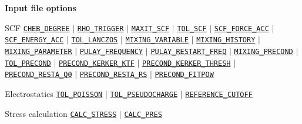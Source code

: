 \documentclass[xcolor=dvipsnames,t]{beamer}
\begin{document}
\begin{frame}[allowframebreaks]{\textbf{Input file options}}
\begin{block}{SCF}
\hyperlink{CHEB_DEGREE}{\texttt{CHEB\_DEGREE}} $\vert$ \hyperlink{RHO_TRIGGER}{\texttt{RHO\_TRIGGER}} $\vert$ \hyperlink{MAXIT_SCF}{\texttt{MAXIT\_SCF}} $\vert$ \hyperlink{TOL_SCF}{\texttt{TOL\_SCF}} $\vert$ \hyperlink{SCF_FORCE_ACC}{\texttt{SCF\_FORCE\_ACC}} $\vert$ \hyperlink{SCF_ENERGY_ACC}{\texttt{SCF\_ENERGY\_ACC}} $\vert$ \hyperlink{TOL_LANCZOS}{\texttt{TOL\_LANCZOS}} $\vert$ \hyperlink{MIXING_VARIABLE}{\texttt{MIXING\_VARIABLE}} $\vert$ \hyperlink{MIXING_HISTORY}{\texttt{MIXING\_HISTORY}} $\vert$ \hyperlink{MIXING_PARAMETER}{\texttt{MIXING\_PARAMETER}} $\vert$ \hyperlink{PULAY_FREQUENCY}{\texttt{PULAY\_FREQUENCY}} $\vert$ \hyperlink{PULAY_RESTART_FREQ}{\texttt{PULAY\_RESTART\_FREQ}} $\vert$ \hyperlink{MIXING_PRECOND}{\texttt{MIXING\_PRECOND}} $\vert$ \hyperlink{TOL_PRECOND}{\texttt{TOL\_PRECOND}} $\vert$ \hyperlink{PRECOND_KERKER_KTF}{\texttt{PRECOND\_KERKER\_KTF}} $\vert$ \hyperlink{PRECOND_KERKER_THRESH}{\texttt{PRECOND\_KERKER\_THRESH}} $\vert$ \hyperlink{PRECOND_RESTA_Q0}{\texttt{PRECOND\_RESTA\_Q0}} $\vert$ \hyperlink{PRECOND_RESTA_RS}{\texttt{PRECOND\_RESTA\_RS}} $\vert$ \hyperlink{PRECOND_FITPOW}{\texttt{PRECOND\_FITPOW}}
\end{block}

\vspace{-2mm}
\begin{block}{Electrostatics}
\hyperlink{TOL_POISSON}{\texttt{TOL\_POISSON}} $\vert$ \hyperlink{TOL_PSEUDOCHARGE}{\texttt{TOL\_PSEUDOCHARGE}} $\vert$ \hyperlink{REFERENCE_CUTOFF}{\texttt{REFERENCE\_CUTOFF}} 
\end{block}

\vspace{-2mm}
\begin{block}{Stress calculation}
\hyperlink{CALC_STRESS}{\texttt{CALC\_STRESS}} $\vert$ \hyperlink{CALC_PRES}{\texttt{CALC\_PRES}}
\end{block}
\vspace{-2mm}


\end{frame}
\end{document}
